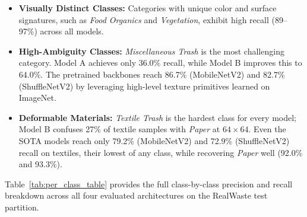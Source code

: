 \documentclass[11pt,a4paper]{article}
\begin{document}
\begin{itemize}[leftmargin=*,itemsep=1pt]
  \item \textbf{Visually Distinct Classes:} Categories with unique color and surface signatures, such as \textit{Food Organics} and \textit{Vegetation}, exhibit high recall (89--97\%) across all models.
  \item \textbf{High-Ambiguity Classes:} \textit{Miscellaneous Trash} is the most challenging category. Model A achieves only 36.0\% recall, while Model B improves this to 64.0\%. The pretrained backbones reach 86.7\% (MobileNetV2) and 82.7\% (ShuffleNetV2) by leveraging high-level texture primitives learned on ImageNet.
  \item \textbf{Deformable Materials:} \textit{Textile Trash} is the hardest class for every model; Model B confuses 27\% of textile samples with \textit{Paper} at $64 \times 64$. Even the SOTA models reach only 79.2\% (MobileNetV2) and 72.9\% (ShuffleNetV2) recall on textiles, their lowest of any class, while recovering \textit{Paper} well (92.0\% and 93.3\%).
\end{itemize}


Table~\ref{tab:per_class_table} provides the full class-by-class precision and recall breakdown across all four evaluated architectures on the RealWaste test partition.
\end{document}
